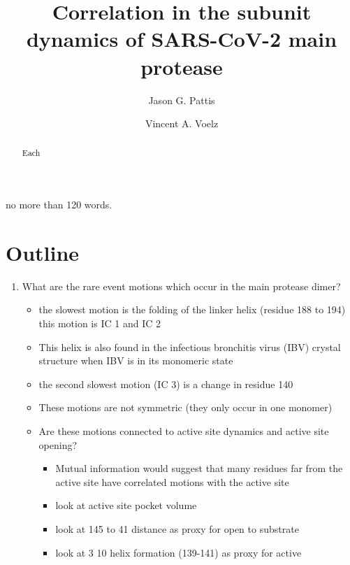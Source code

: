 \documentclass{biophys-new}
\title{Correlation in the subunit dynamics of SARS-CoV-2 main protease}
\author[1,]{Jason G. Pattis}
\author[1,*]{Vincent A. Voelz}
\affil[1]{Temple University, Philadelphia, Pennsylvania 19122, USA}
\begin{document}
\begin{frontmatter}

\begin{abstract}
Each 
\end{abstract}

\begin{sigstatement}
no more than 120 words.
\end{sigstatement}
\end{frontmatter}

\section*{Outline}

\begin{enumerate}
    \item What are the rare event motions which occur in the main protease dimer?
    \begin{itemize}
        \item the slowest motion is the folding of the linker helix (residue 188 to 194) this motion is IC 1 and IC 2
        \item This helix is also found in the infectious bronchitis virus (IBV) crystal structure when IBV is in its monomeric state
        \item the second slowest motion (IC 3) is a change in residue 140
        \item These motions are not symmetric (they only occur in one monomer) 
        \item Are these motions connected to active site dynamics and active site opening?
        \begin{itemize}
            \item Mutual information would suggest that many residues far from the active site have correlated motions with the active site
            \color{blue}
            \item look at active site pocket volume
            \item look at 145 to 41 distance as proxy for open to substrate
            \item look at 3 10 helix formation (139-141) as proxy for active
        \end{itemize}
    

\end{itemize}
\end{enumerate}
\end{document}
